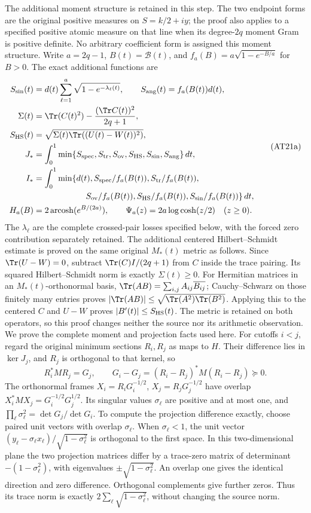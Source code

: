 The additional moment structure is retained in this step. The two
endpoint forms are the original positive measures on $S=k/2+iy$;
the proof also applies to a specified positive atomic measure on
that line when its degree-$2q$ moment Gram is positive definite.
No arbitrary coefficient form is assigned this moment structure.
Write $a=2q-1$, $B(t)=\mathcal B(t)$, and
$f_a(B)=a\sqrt{1-e^{-B/a}}$ for $B>0$. The exact additional
functions are
\[
\begin{aligned}
S_{\rm sin}(t)&=d(t)\sum_{\ell=1}^a\sqrt{1-e^{-\lambda_\ell(t)}},
\qquad S_{\rm ang}(t)=f_a(B(t))d(t),\\
\Sigma(t)&=\Tr(C(t)^2)-\frac{(\Tr C(t))^2}{2q+1},\\
S_{\rm HS}(t)&=\sqrt{\Sigma(t)\Tr((U(t)-W(t))^2)},\\
J_*&=\int_0^1\min\{S_{\rm spec},S_{\rm tr},S_{\rm ov},
                      S_{\rm HS},S_{\rm sin},S_{\rm ang}\}\,dt,\\
I_*&=\int_0^1\min\{d(t),S_{\rm spec}/f_a(B(t)),
                    S_{\rm tr}/f_a(B(t)),\\
&\hspace{22mm}S_{\rm ov}/f_a(B(t)),S_{\rm HS}/f_a(B(t)),S_{\rm sin}/f_a(B(t))\}\,dt,\\
H_a(B)&=2\operatorname{arcosh}(e^{B/(2a)}),\qquad
\Psi_a(z)=2a\log\cosh(z/2)\quad(z\ge0).
\end{aligned}\tag{AT21a}
\]
The $\lambda_\ell$ are the complete crossed-pair losses specified
below, with the forced zero contribution separately retained.
The additional centered Hilbert--Schmidt estimate is proved on the
same original $M_*(t)$ metric as follows. Since $\Tr(U-W)=0$,
subtract $\Tr(C)I/(2q+1)$ from $C$ inside the trace pairing.
Its squared Hilbert--Schmidt norm is exactly $\Sigma(t)\ge0$.
For Hermitian matrices in an $M_*(t)$-orthonormal basis,
$\Tr(AB)=\sum_{i,j}A_{ij}\overline{B_{ij}}$; Cauchy--Schwarz
on those finitely many entries proves
$|\Tr(AB)|\le\sqrt{\Tr(A^2)\Tr(B^2)}$. Applying this to the
centered $C$ and $U-W$ proves $|B'(t)|\le S_{\rm HS}(t)$.
The metric is retained on both operators, so this proof changes
neither the source nor its arithmetic observation.
We prove the complete moment and projection facts used here. For
cutoffs $i<j$, regard the original minimum sections $R_i,R_j$ as
maps to $H$. Their difference lies in $\ker J_j$, and $R_j$ is
orthogonal to that kernel, so
\[
R_i^*MR_j=G_j,\qquad
G_i-G_j=(R_i-R_j)^*M(R_i-R_j)\succeq0.
\]
The orthonormal frames $X_i=R_iG_i^{-1/2}$,
$X_j=R_jG_j^{-1/2}$ have overlap
$X_i^*MX_j=G_i^{-1/2}G_j^{1/2}$. Its singular values
$\sigma_\ell$ are positive and at most one, and
$\prod_\ell\sigma_\ell^2=\det G_j/\det G_i$.
To compute the projection difference exactly, choose paired unit
vectors with overlap $\sigma_\ell$. When $\sigma_\ell<1$, the
unit vector $(y_\ell-\sigma_\ell x_\ell)/\sqrt{1-\sigma_\ell^2}$
is orthogonal to the first space. In this two-dimensional plane the
two projection matrices differ by a trace-zero matrix of determinant
$-(1-\sigma_\ell^2)$, with eigenvalues
$\pm\sqrt{1-\sigma_\ell^2}$. An overlap one gives the identical
direction and zero difference. Orthogonal complements give further
zeros. Thus its trace norm is exactly
$2\sum_\ell\sqrt{1-\sigma_\ell^2}$, without changing the source norm.

